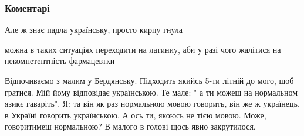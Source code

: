  
 
 
 
 
\subsubsection{Коментарі}
\label{sec:24_06_2021.fb.ukrainec_ostap.1.apteka_jazyk.cmt}

\begin{itemize}
 
Але ж знає падла українську, просто кирпу гнула

 
можна в таких ситуаціях переходити на латиниу, аби у разі чого жалітися на некомпетентність фармацевтки

 

Відпочиваємо з малим у Бердянську. Підходить якийсь 5-ти літній до мого, щоб
гратися. Мій йому відповідає українською. Те мале: " а ти можеш на нормальном
язикє гаваріть". Я: та він як раз нормальною мовою говорить, він же ж
українець, в Україні говорить українською. А ось ти, якоюсь не тією мовою.
Може, говоритимеш нормальною? В малого в голові щось явно закрутилося.


 

\end{itemize}
